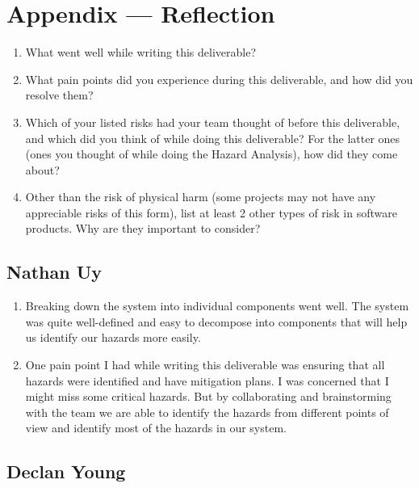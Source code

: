 \documentclass{article}
\begin{document}
\section*{Appendix --- Reflection}

\begin{enumerate}
    \item What went well while writing this deliverable? 
    \item What pain points did you experience during this deliverable, and how
    did you resolve them?
    \item Which of your listed risks had your team thought of before this
    deliverable, and which did you think of while doing this deliverable? For
    the latter ones (ones you thought of while doing the Hazard Analysis), how
    did they come about?
    \item Other than the risk of physical harm (some projects may not have any
    appreciable risks of this form), list at least 2 other types of risk in
    software products. Why are they important to consider?
\end{enumerate}  

\subsection*{Nathan Uy}

\begin{enumerate}
    \item Breaking down the system into individual components went well. The system was quite well-defined and easy to decompose into components that will help us identify our hazards more easily.
    \item One pain point I had while writing this deliverable was ensuring that all hazards were identified and have mitigation plans. I was concerned that I might miss some critical hazards. But by collaborating and brainstorming with the team we are able to identify the hazards from different points of view and identify most of the hazards in our system.

\end{enumerate}  

\subsection*{Declan Young}
\end{document}
